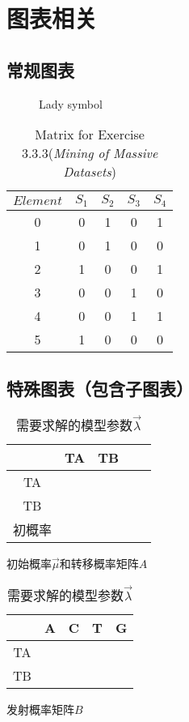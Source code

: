 \documentclass[a4paper,12pt]{article}
\begin{document}
\section{图表相关}

\subsection{常规图表}

\begin{figure}[H] %
\centering
\fontsize{150}{60}\selectfont\Ladiesroom
\caption{Lady symbol}\label{fig:1}
\end{figure}

\begin{table}[!ht]
\centering
\begin{tabular}{c|c|c|c|c} 
$Element$ & $S_1$ & $S_2$ & $S_3$ & $S_4$ \\
\hline
\hline
0 & 0 & 1 & 0 & 1 \\
1 & 0 & 1 & 0 & 0 \\
2 & 1 & 0 & 0 & 1 \\
3 & 0 & 0 & 1 & 0 \\
4 & 0 & 0 & 1 & 1 \\
5 & 1 & 0 & 0 & 0 \\
\end{tabular}
\caption{Matrix for Exercise 3.3.3(\textit{Mining of Massive Datasets})}
\end{table}


\subsection{特殊图表（包含子图表）}

\begin{table}[htb]
	\begin{subtable}{.5\linewidth}\centering
    \begin{tabular}{|c|c|c|c|c|}
     \hline
     & TA & TB\\
     \hline
     TA & & \\
     \hline
     TB & & \\
     \hline\hline
     初概率 & & \\
     \hline
    \end{tabular}
	\caption{初始概率$\vec \mu$和转移概率矩阵$A$}\label{tab:1a}
	\end{subtable}
	\begin{subtable}{.5\linewidth}\centering
    \begin{tabular}{|c|c|c|c|c|} 
      \hline
       & A & C & T & G \\
      \hline
       TA & & & & \\
      \hline
       TB & & & & \\
      \hline
    \end{tabular}
	\caption{发射概率矩阵$B$}\label{tab:1b}
	\end{subtable}
\caption{需要求解的模型参数$\vec\lambda$}\label{tab:1}
\end{table}
\end{document}
